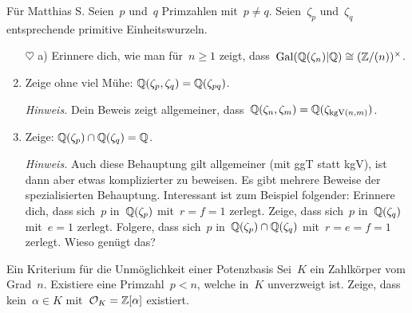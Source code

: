 \documentclass{uebblatt}
\begin{document}
\begin{aufgabe}{Für Matthias S.}
Seien~$p$ und~$q$ Primzahlen mit~$p \neq q$. Seien~$\zeta_p$ und~$\zeta_q$
entsprechende primitive Einheitswurzeln.
\begin{enumerate}
\item[$\heartsuit$ a)] Erinnere dich, wie man für~$n \geq 1$ zeigt,
dass~$\mathrm{Gal}(\mathbb{Q}(\zeta_n)|\mathbb{Q}) \cong (\mathbb{Z}/(n))^\times$.
\addtocounter{enumi}{1}

\item Zeige ohne viel Mühe: $\mathbb{Q}(\zeta_p, \zeta_q) = \mathbb{Q}(\zeta_{pq})$.

{\tiny\emph{Hinweis.} Dein Beweis zeigt allgemeiner, dass~$\mathbb{Q}(\zeta_n,
\zeta_m) = \mathbb{Q}(\zeta_{\operatorname{kgV}(n,m)})$.\par}
\item Zeige: $\mathbb{Q}(\zeta_p) \cap \mathbb{Q}(\zeta_q) = \mathbb{Q}$.

{\tiny\emph{Hinweis.} Auch diese Behauptung gilt allgemeiner (mit ggT statt
kgV), ist dann aber etwas komplizierter zu beweisen. Es gibt mehrere Beweise
der spezialisierten Behauptung. Interessant ist zum Beispiel folgender:
Erinnere dich, dass sich~$p$ in~$\mathbb{Q}(\zeta_p)$ mit~$r = f = 1$ zerlegt. Zeige,
dass sich~$p$ in~$\mathbb{Q}(\zeta_q)$ mit~$e = 1$ zerlegt. Folgere, dass sich~$p$
in~$\mathbb{Q}(\zeta_p) \cap \mathbb{Q}(\zeta_q)$ mit~$r = e = f = 1$ zerlegt. Wieso genügt
das?\par}
\end{enumerate}
\end{aufgabe}

\begin{aufgabe}{Ein Kriterium für die Unmöglichkeit einer Potenzbasis}
Sei~$K$ ein Zahlkörper vom Grad~$n$. Existiere eine Primzahl~$p < n$, welche
in~$K$ unverzweigt ist. Zeige, dass kein~$\alpha \in K$ mit~$\mathcal{O}_K =
\mathbb{Z}[\alpha]$ existiert.
\end{aufgabe}
\end{document}
